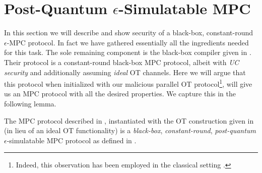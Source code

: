 \section{Post-Quantum $\epsilon$-Simulatable MPC}
\label{sec:MPC}

In this section we will describe and show security of a black-box, constant-round $\epsilon$-MPC protocol. In fact we have gathered essentially all the ingredients needed for this task. The sole remaining component is the black-box compiler given in \cite{C:IshPraSah08}. Their protocol is a constant-round black-box MPC protocol, albeit with {\em UC security} and additionally assuming {\em ideal} OT channels. Here we will argue that this protocol when initialized with our malicious parallel OT protocol\footnote{Indeed, this observation has been employed in the classical setting \cite{FOCS:Wee10,STOC:Goyal11}.}, will give us an MPC protocol with all the desired properties. We capture this in the following lemma. 

\begin{lemma}
    The MPC protocol described in \cite{C:IshPraSah08}, instantiated with the OT construction given in   (in lieu of an ideal OT functionality) is a \emph{black-box}, {\em constant-round}, \emph{post-quantum} $\epsilon$-simulatable MPC protocol as defined in . 
\end{lemma}

